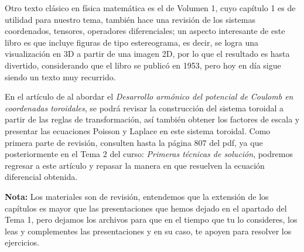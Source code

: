 \par
Otro texto clásico en física matemática es el de \cite{Morse1953} Volumen 1, cuyo capítulo 1 es de utilidad para nuestro tema, también hace una revisión de los sistemas coordenados, tensores, operadores diferenciales; un aspecto interesante de este libro es que incluye figuras de tipo estereograma, es decir, se logra una visualización en 3D a partir de una imagen 2D, por lo que el resultado es hasta divertido, considerando que el libro se publicó en 1953, pero hoy en día sigue siendo un texto muy recurrido.
\par
En el artículo de \cite{LeyKoo1994} al abordar el \emph{Desarrollo armónico del potencial de Coulomb en coordenadas toroidales}, se podrá revisar la construcción del sistema toroidal a partir de las reglas de transformación, así también obtener los factores de escala y presentar las ecuaciones Poisson y Laplace en este sistema toroidal. Como primera parte de revisión, consulten hasta la página $807$ del pdf, ya que posteriormente en el Tema 2 del curso: \emph{Primeras técnicas de solución}, podremos regresar a este artículo y repasar la manera en que resuelven la ecuación diferencial obtenida.
\par
\textbf{Nota: } Los materiales son de revisión, entendemos que la extensión de los capítulos es mayor que las presentaciones que hemos dejado en el apartado del Tema 1, pero dejamos los archivos para que en el tiempo que tu lo consideres, los leas y complementes las presentaciones y en su caso, te apoyen para resolver los ejercicios.


